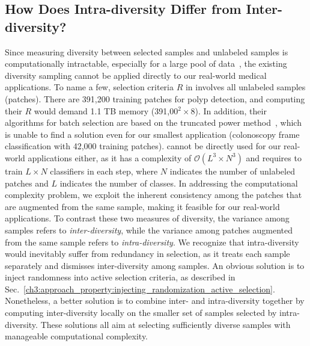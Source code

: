 \subsection{How Does Intra-diversity Differ from Inter-diversity?}
\label{ch3:discussion_conclusion:interdiversity_differ_from_interdiversity}

Since measuring diversity between selected samples and unlabeled samples is computationally intractable, especially for a large pool of data~\citep{sourati2016classification}, the existing diversity sampling cannot be applied directly to our real-world medical applications. To name a few, selection criteria $R$ in \citet{chakraborty2015active} involves all unlabeled samples (patches). There are 391,200 training patches for polyp detection, and computing their $R$ would demand 1.1 TB memory (391,00$^2\times$8). In addition, their algorithms for batch selection are based on the truncated power method~\citep{yuan2013truncated}, which is unable to find a solution even for our smallest application (colonoscopy frame classification with 42,000 training patches). \citet{holub2008entropy} cannot be directly used for our real-world applications either, as it has a complexity of $\mathcal{O}(L^3\times N^3)$ and requires to train $L\times N$ classifiers in each step, where $N$ indicates the number of unlabeled patches and $L$ indicates the number of classes. In addressing the computational complexity problem, we exploit the inherent consistency among the patches that are augmented from the same sample, making it feasible for our real-world applications. To contrast these two measures of diversity, the variance among samples refers to \textit{inter-diversity}, while the variance among patches augmented from the same sample refers to \textit{intra-diversity}. We recognize that intra-diversity would inevitably suffer from redundancy in selection, as it treats each sample separately and dismisses inter-diversity among samples. An obvious solution is to inject randomness into active selection criteria, as described in Sec.~\ref{ch3:approach_property:injecting_randomization_active_selection}. Nonetheless, a better solution is to combine inter- and intra-diversity together by computing inter-diversity locally on the smaller set of samples selected by intra-diversity. These solutions all aim at selecting sufficiently diverse samples with manageable computational complexity.


